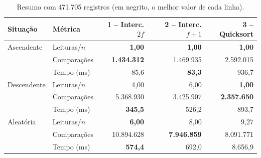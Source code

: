 \documentclass{article}
\begin{document}
\begin{table}[!htb]
    \centering
    \footnotesize
    \begin{tabular}{|l|l|r|r|r|}
        \hline\hline
        Situação & Métrica & 1 -- Interc. $2f$ & 2 -- Interc. $f+1$ & 3 -- Quicksort \\\hline
        Ascendente  & Leituras/$n$ & \textbf{1,00} & \textbf{1,00} & \textbf{1,00} \\
                    & Comparações  & \textbf{1.434.312} & 1.469.935 & 2.592.015 \\
                    & Tempo (ms)   & 85,6 & \textbf{83,3} & 936,7 \\\hline
        Descendente & Leituras/$n$ & 4,00 & 6,00 & \textbf{1,00} \\
                    & Comparações  & 5.368.930 & 3.425.907 & \textbf{2.357.650} \\
                    & Tempo (ms)   & \textbf{345,5} & 526,2 & 893,7 \\\hline
        Aleatória   & Leituras/$n$ & \textbf{6,00} & 8,00 & 9,27 \\
                    & Comparações  & 10.894.628 & \textbf{7.946.859} & 8.091.771 \\
                    & Tempo (ms)   & \textbf{574,4} & 692,0 & 8.656,9 \\\hline\hline
    \end{tabular}
    \caption{\label{tab:resumo}Resumo com 471.705 registros (em negrito, o melhor valor de cada linha).}
\end{table}
\end{document}
